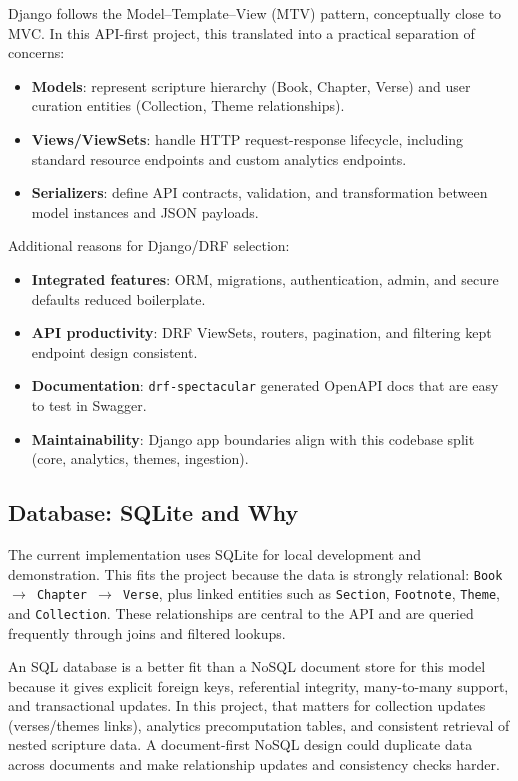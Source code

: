 \documentclass[11pt,a4paper]{article}
\begin{document}
Django follows the Model--Template--View (MTV) pattern, conceptually close to MVC. In this API-first project, this translated into a practical separation of concerns:
\begin{itemize}[leftmargin=*]
	\item \textbf{Models}: represent scripture hierarchy (Book, Chapter, Verse) and user curation entities (Collection, Theme relationships).
	\item \textbf{Views/ViewSets}: handle HTTP request-response lifecycle, including standard resource endpoints and custom analytics endpoints.
	\item \textbf{Serializers}: define API contracts, validation, and transformation between model instances and JSON payloads.
\end{itemize}

Additional reasons for Django/DRF selection:
\begin{itemize}[leftmargin=*]
	\item \textbf{Integrated features}: ORM, migrations, authentication, admin, and secure defaults reduced boilerplate.
	\item \textbf{API productivity}: DRF ViewSets, routers, pagination, and filtering kept endpoint design consistent.
	\item \textbf{Documentation}: \texttt{drf-spectacular} generated OpenAPI docs that are easy to test in Swagger.
	\item \textbf{Maintainability}: Django app boundaries align with this codebase split (core, analytics, themes, ingestion).
\end{itemize}

\subsection{Database: SQLite and Why}
The current implementation uses SQLite for local development and demonstration. This fits the project because the data is strongly relational: \texttt{Book $\rightarrow$ Chapter $\rightarrow$ Verse}, plus linked entities such as \texttt{Section}, \texttt{Footnote}, \texttt{Theme}, and \texttt{Collection}. These relationships are central to the API and are queried frequently through joins and filtered lookups.

An SQL database is a better fit than a NoSQL document store for this model because it gives explicit foreign keys, referential integrity, many-to-many support, and transactional updates. In this project, that matters for collection updates (verses/themes links), analytics precomputation tables, and consistent retrieval of nested scripture data. A document-first NoSQL design could duplicate data across documents and make relationship updates and consistency checks harder.
\end{document}
